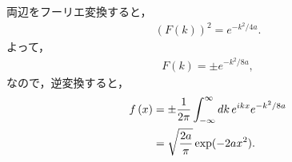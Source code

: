 両辺をフーリエ変換すると，
\begin{align}
  \left(F\left(k\right)\right)^2 = e^{-k^2/4a}.
\end{align}
よって，
\begin{align}
  F\left(k\right) = \pm e^{-k^2/8a},
\end{align}
なので，逆変換すると，
\begin{align}
 f\left(x\right) &= \pm \dfrac{1}{2\pi}\int_{-\infty}^{\infty}dk\,e^{ikx}e^{-k^2/8a} \notag \\
                 &= \sqrt{\dfrac{2a}{\pi}}\exp(-2ax^2). 
\end{align}

